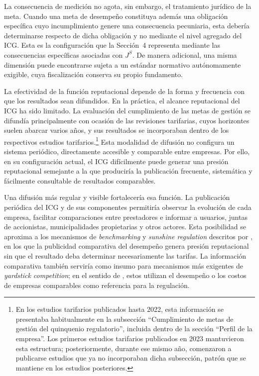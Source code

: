 La consecuencia de medición no agota, sin embargo, el tratamiento jurídico de la meta. Cuando una meta de desempeño constituya además una obligación específica cuyo incumplimiento genere una consecuencia pecuniaria, esta debería determinarse respecto de dicha obligación y no mediante el nivel agregado del ICG. Esta es la configuración que la Sección~4 representa mediante las consecuencias específicas asociadas con \(J^{S}\). De manera adicional, una misma dimensión puede encontrarse sujeta a un estándar normativo autónomamente exigible, cuya fiscalización conserva su propio fundamento.

La efectividad de la función reputacional depende de la forma y frecuencia con que los resultados sean difundidos. En la práctica, el alcance reputacional del ICG ha sido limitado. La evaluación del cumplimiento de las metas de gestión se difundía principalmente con ocasión de las revisiones tarifarias, cuyos horizontes suelen abarcar varios años, y sus resultados se incorporaban dentro de los respectivos estudios tarifarios.\footnote{En los estudios tarifarios publicados hasta 2022, esta información se presentaba habitualmente en la subsección ``Cumplimiento de metas de gestión del quinquenio regulatorio'', incluida dentro de la sección ``Perfil de la empresa''. Los primeros estudios tarifarios publicados en 2023 mantuvieron esta estructura; posteriormente, durante ese mismo año, comenzaron a publicarse estudios que ya no incorporaban dicha subsección, patrón que se mantiene en los estudios posteriores.} Esta modalidad de difusión no configura un sistema periódico, directamente accesible y comparable entre empresas. Por ello, en su configuración actual, el ICG difícilmente puede generar una presión reputacional semejante a la que produciría la publicación frecuente, sistemática y fácilmente consultable de resultados comparables.

Una difusión más regular y visible fortalecería esa función. La publicación periódica del ICG y de sus componentes permitiría observar la evolución de cada empresa, facilitar comparaciones entre prestadores e informar a usuarios, juntas de accionistas, municipalidades propietarias y otros actores. Esta posibilidad se aproxima a los mecanismos de \emph{benchmarking} y \emph{sunshine regulation} descritos por \citet{marques2010towards}, en los que la publicidad comparativa del desempeño genera presión reputacional sin que el resultado deba determinar necesariamente las tarifas. La información comparativa también serviría como insumo para mecanismos más exigentes de \emph{yardstick competition}; en el sentido de \citet{shleifer1985theory}, estos utilizan el desempeño o los costos de empresas comparables como referencia para la regulación.

